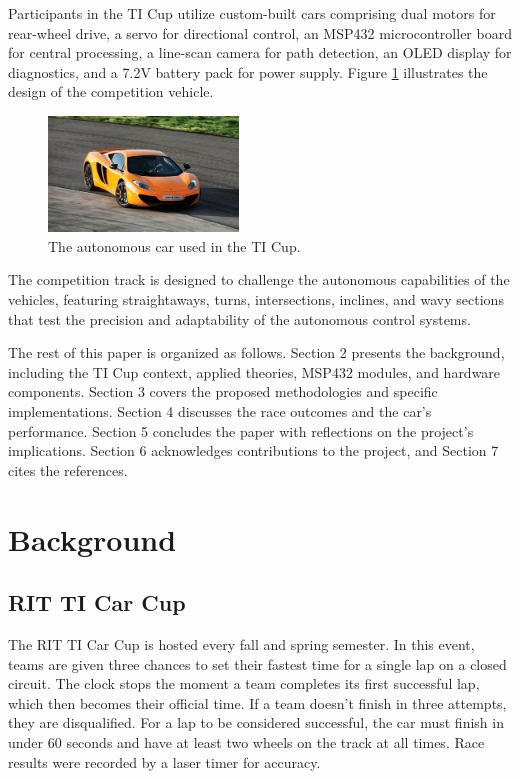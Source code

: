 \documentclass[conference]{IEEEtran}
\begin{document}
Participants in the TI Cup utilize custom-built cars comprising dual motors for rear-wheel drive, a servo for directional control, an MSP432 microcontroller board for central processing, a line-scan camera for path detection, an OLED display for diagnostics, and a 7.2V battery pack for power supply. Figure \ref{fig:car} illustrates the design of the competition vehicle.

\begin{figure}[htbp]
	\centerline{\includegraphics[width=0.45\textwidth]{images/car.jpg}}
	\caption{The autonomous car used in the TI Cup.}
	\label{fig:car}
\end{figure}

The competition track is designed to challenge the autonomous capabilities of the vehicles, featuring straightaways, turns, intersections, inclines, and wavy sections that test the precision and adaptability of the autonomous control systems.

The rest of this paper is organized as follows. Section 2 presents the background, including the TI Cup context, applied theories, MSP432 modules, and hardware components. Section 3 covers the proposed methodologies and specific implementations. Section 4 discusses the race outcomes and the car's performance. Section 5 concludes the paper with reflections on the project's implications. Section 6 acknowledges contributions to the project, and Section 7 cites the references.

\section{Background}

\subsection{RIT TI Car Cup}

The RIT TI Car Cup is hosted every fall and spring semester. In this event, teams are given three chances to set their fastest time for a single lap on a closed circuit. The clock stops the moment a team completes its first successful lap, which then becomes their official time. If a team doesn't finish in three attempts, they are disqualified. For a lap to be considered successful, the car must finish in under 60 seconds and have at least two wheels on the track at all times. Race results were recorded by a laser timer for accuracy.
\end{document}
